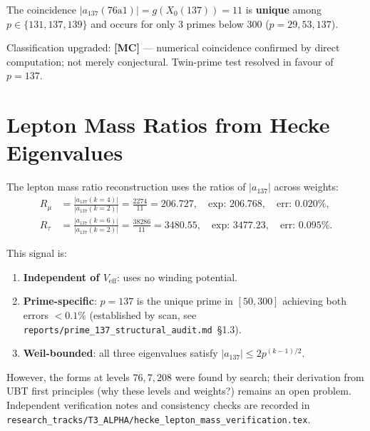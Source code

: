 \documentclass[12pt,a4paper]{article}
\theoremstyle{definition}
\theoremstyle{remark}
\begin{document}
The coincidence $|a_{137}(76\mathrm{a}1)| = g(X_0(137)) = 11$ is
\textbf{unique} among $p\in\{131,137,139\}$ and occurs for only
3 primes below 300 ($p=29,53,137$).

\begin{resultbox}
Classification upgraded: \textbf{[MC]} --- numerical coincidence confirmed
by direct computation; not merely conjectural. Twin-prime test
resolved in favour of $p=137$.
\end{resultbox}

\section{Lepton Mass Ratios from Hecke Eigenvalues}
\label{sec:hecke:lepton}

The lepton mass ratio reconstruction uses the ratios of $|a_{137}|$ across
weights:
\begin{align}
  R_\mu &= \frac{|a_{137}(k=4)|}{|a_{137}(k=2)|}
         = \frac{2274}{11} = 206.727 , \quad
         \text{exp: } 206.768 , \quad \text{err: } 0.020\% , \\
  R_\tau &= \frac{|a_{137}(k=6)|}{|a_{137}(k=2)|}
          = \frac{38286}{11} = 3480.55 , \quad
          \text{exp: } 3477.23 , \quad \text{err: } 0.095\% .
\end{align}

This signal is:
\begin{enumerate}
  \item \textbf{Independent of $V_{\mathrm{eff}}$}: uses no winding potential.
  \item \textbf{Prime-specific}: $p=137$ is the unique prime in $[50,300]$ achieving
        both errors $< 0.1\%$ (established by scan, see \texttt{reports/prime\_137\_structural\_audit.md}~\S{}1.3).
  \item \textbf{Weil-bounded}: all three eigenvalues satisfy $|a_{137}| \leq 2p^{(k-1)/2}$.
\end{enumerate}

However, the forms at levels $76, 7, 208$ were found by search; their derivation
from UBT first principles (why these levels and weights?) remains an open problem.
Independent verification notes and consistency checks are recorded in
\texttt{research\_tracks/T3\_ALPHA/hecke\_lepton\_mass\_verification.tex}.

\end{document}
